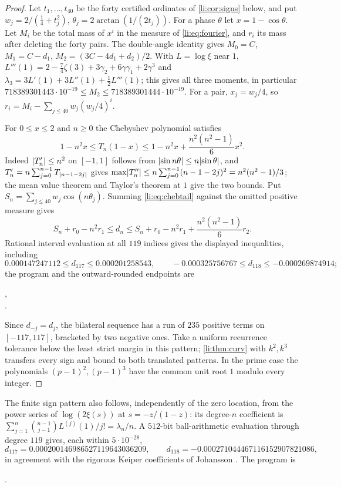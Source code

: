 \begin{proof}
Let $t_1,\dots,t_{40}$ be the forty certified ordinates of \cref{li:cor:signs} below, and put
$w_j=2/(\frac14+t_j^2)$, $\theta_j=2\arctan(1/(2t_j))$. For a phase $\theta$ let $x=1-\cos\theta$.
Let $M_i$ be the total mass of $x^i$ in the measure of \eqref{li:eq:fourier}, and $r_i$ its mass
after deleting the forty pairs. The double-angle identity gives $M_0=C$, $M_1=C-d_1$,
$M_2=(3C-4d_1+d_2)/2$. With $L=\log\xi$ near $1$,
$L'''(1)=2-\frac74\zeta(3)+3\gamma_2+6\gamma\gamma_1+2\gamma^3$ and
$\lambda_3=3L'(1)+3L''(1)+\frac12L'''(1)$; this gives all three moments, in particular
$718389301443\cdot10^{-19}\le M_2\le718389301444\cdot10^{-19}$. For a pair, $x_j=w_j/4$, so
$r_i=M_i-\sum_{j\le40}w_j(w_j/4)^i$.

For $0\le x\le2$ and $n\ge0$ the Chebyshev polynomial satisfies
\begin{equation}\label{li:eq:chebtail}
 1-n^2x\le T_n(1-x)\le1-n^2x+\frac{n^2(n^2-1)}6x^2 .
\end{equation}
Indeed $\lvert T_n'\rvert\le n^2$ on $[-1,1]$ follows from $\lvert\sin n\theta\rvert\le n\lvert\sin\theta\rvert$, and
$T_n'=n\sum_{j=0}^{n-1}T_{\lvert n-1-2j\rvert}$ gives
$\max\lvert T_n''\rvert\le n\sum_{j=0}^{n-1}(n-1-2j)^2=n^2(n^2-1)/3$; the mean value theorem and Taylor's
theorem at $1$ give the two bounds. Put $S_n=\sum_{j\le40}w_j\cos(n\theta_j)$. Summing
\eqref{li:eq:chebtail} against the omitted positive measure gives
\[
 S_n+r_0-n^2r_1\le d_n\le S_n+r_0-n^2r_1+\frac{n^2(n^2-1)}6r_2 .
\]
Rational interval evaluation at all $119$ indices gives the displayed inequalities, including
\[
 0.000147247112\le d_{117}\le0.000201258543,\qquad-0.000325756767\le d_{118}\le-0.000269874914 ;
\]
the program and the outward-rounded endpoints are
\begin{center}
,\\
.
\end{center}

Since $d_{-j}=d_j$, the bilateral sequence has a run of $235$ positive terms on $[-117,117]$,
bracketed by two negative ones. Take a uniform recurrence tolerance below the least strict margin
in this pattern; \cref{li:thm:curv} with $k^2,k^3$ transfers every sign and bound to both
translated patterns. In the prime case the polynomials $(p-1)^2,(p-1)^3$ have the common unit
root $1$ modulo every integer.
\end{proof}

The finite sign pattern also follows, independently of the zero location, from the power series
of $\log(2\xi(s))$ at $s=-z/(1-z)$: its degree-$n$ coefficient is
$\sum_{j=1}^n\binom{n-1}{j-1}L^{(j)}(1)/j!=\lambda_n/n$. A $512$-bit ball-arithmetic evaluation
through degree $119$ gives, each within $5\cdot10^{-28}$,
\[
 d_{117}=0.000200146986527119643036209,\qquad d_{118}=-0.000271044467116152907821086,
\]
in agreement with the rigorous Keiper coefficients of Johansson \cite{Johansson2015Rigorous}. The
program is
\begin{center}
.
\end{center}

